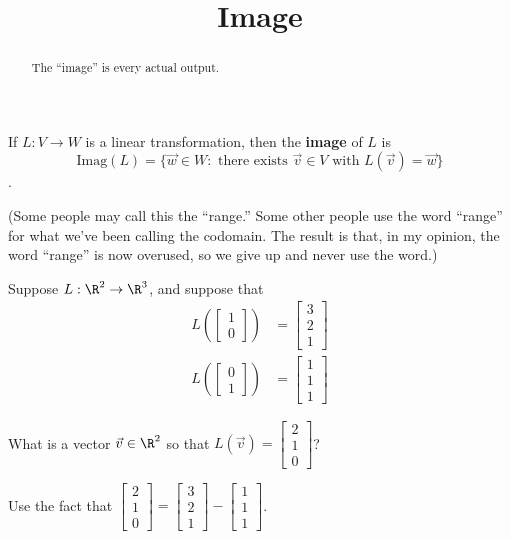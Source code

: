 \documentclass{ximera}
\title{Image}
\begin{document}
\begin{abstract}
  The ``image'' is every actual output.
\end{abstract}

\begin{definition}
  If $L:V \to W$ is a linear transformation, then the \textbf{image}
  of $L$ is $$\text{Imag}(L) = \{\vec{w} \in W: \text{ there exists
    $\vec{v} \in V $ with }L(\vec{v}) = \vec{w}\}$$.
\end{definition}

(Some people may call this the ``range.''  Some other people use the
word ``range'' for what we've been calling the codomain.  The result
is that, in my opinion, the word ``range'' is now overused, so we give
up and never use the word.)

\begin{question}
  Suppose $L : \R^2 \to \R^3$, and suppose that
  \begin{align*}
    L\left(\begin{bmatrix} 1 \\ 0 \end{bmatrix}\right) &= \begin{bmatrix} 3 \\ 2 \\ 1 \end{bmatrix} \\
    L\left(\begin{bmatrix} 0 \\ 1 \end{bmatrix}\right) &= \begin{bmatrix} 1 \\ 1 \\ 1 \end{bmatrix}
  \end{align*}

  What is a vector $\vec{v} \in \R^2$ so that $L(\vec{v}) = \begin{bmatrix} 2 \\ 1 \\ 0 \end{bmatrix}$?

  \begin{solution}
    \begin{hint}
      Use the fact that $\begin{bmatrix} 2 \\ 1 \\ 0 \end{bmatrix} = \begin{bmatrix} 3 \\ 2 \\ 1 \end{bmatrix} - \begin{bmatrix} 1 \\ 1 \\ 1 \end{bmatrix}$.
    \end{hint}


\end{solution}
\end{question}
\end{document}

